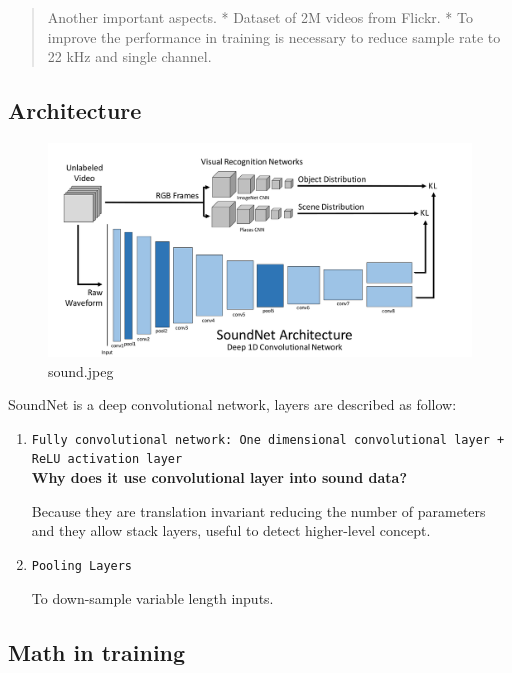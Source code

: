 \documentclass[11pt]{article}
\makeatletter
\def\maxwidth{\ifdim\Gin@nat@width>\linewidth\linewidth
    \else\Gin@nat@width\fi}
\let\Oldincludegraphics\includegraphics
\renewcommand{\includegraphics}[1]{\Oldincludegraphics[width=.8\maxwidth]{#1}}
\makeatother
\begin{document}
\begin{quote}
Another important aspects. * Dataset of 2M videos from Flickr. * To
improve the performance in training is necessary to reduce sample rate
to 22 kHz and single channel.
\end{quote}

    \subsection{Architecture}\label{architecture}

\begin{figure}
\centering
\includegraphics{../TP's/images/sound.jpeg}
\caption{sound.jpeg}
\end{figure}

    SoundNet is a deep convolutional network, layers are described as
follow:

\begin{enumerate}
\def\labelenumi{\arabic{enumi}.}
\item
  \texttt{Fully\ convolutional\ network:\ One\ dimensional\ convolutional\ layer\ +\ ReLU\ activation\ layer}\\
  \textbf{Why does it use convolutional layer into sound data?}

  Because they are translation invariant reducing the number of
  parameters and they allow stack layers, useful to detect higher-level
  concept.
\item
  \texttt{Pooling\ Layers}

  To down-sample variable length inputs.
\end{enumerate}

    \subsection{Math in training}\label{math-in-training}
\end{document}
